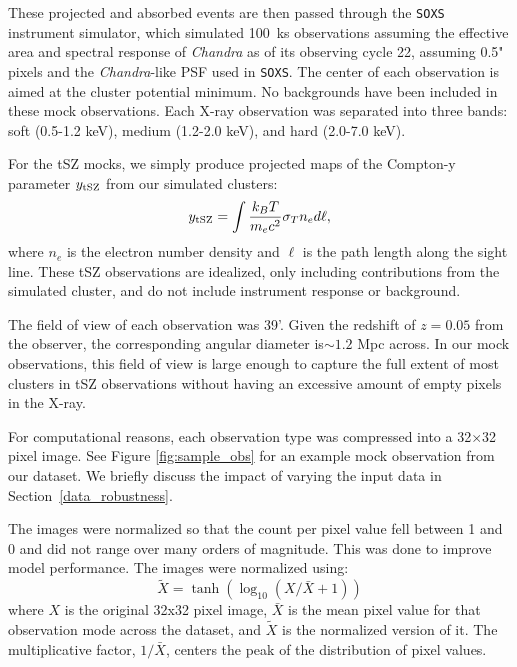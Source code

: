 \documentclass[twocolumn, linenumbers, 11pt]{aastex63}%
\begin{document}
These projected and absorbed events are then passed through the \texttt{SOXS} instrument simulator, which simulated 100~ks observations assuming the effective area and spectral response of {\it Chandra} as of its observing cycle 22, assuming 0.5" pixels and the {\it Chandra}-like PSF used in \texttt{SOXS}. The center of each observation is aimed at the cluster potential minimum. No backgrounds have been included in these mock observations. Each X-ray observation was separated into three bands: soft (0.5-1.2 keV), medium (1.2-2.0 keV), and hard (2.0-7.0 keV). 

For the tSZ mocks, we simply produce projected maps of the Compton-y parameter $y_{\rm tSZ}$ from our simulated clusters:
\begin{equation}
y_{\rm tSZ} = \int\frac{k_BT}{m_ec^2}\sigma_Tn_ed\ell,
\end{equation}
where $n_e$ is the electron number density and $\ell$ is the path length along the sight line. These tSZ observations are idealized, only including contributions from the simulated cluster, and do not include instrument response or background. 

The field of view of each observation was 39'. Given the redshift of $z=0.05$ from the observer, the corresponding angular diameter is$\sim1.2$ Mpc across. In our mock observations, this field of view is large enough to capture the full extent of most clusters in tSZ observations without having an excessive amount of empty pixels in the X-ray.

For computational reasons, each observation type was compressed into a 32$\times$32 pixel image. See Figure \ref{fig:sample_obs} for an example mock observation from our dataset. We briefly discuss the impact of varying the input data in Section~\ref{data_robustness}. 

The images were normalized so that the count per pixel value fell between 1 and 0 and did not range over many orders of magnitude. This was done to improve model performance. The images were normalized using:
\begin{equation}\label{eqn:norm}
    \tilde{X} = \tanh\left(\log_{10}\left(X/\bar{X} + 1\right)\right)
\end{equation}
where $X$ is the original 32x32 pixel image, $\bar{X}$ is the mean pixel value for that observation mode across the dataset, and $\tilde{X}$ is the normalized version of it. The multiplicative factor, $1/\bar{X}$, centers the peak of the distribution of pixel values.
\end{document}

